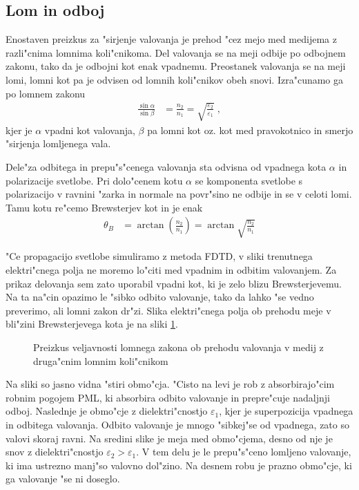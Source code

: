 \documentclass[a4paper,10pt]{article}
\begin{document}
\subsection{Lom in odboj}
Enostaven preizkus za "sirjenje valovanja je prehod "cez mejo med medijema z razli"cnima lomnima koli"cnikoma. 
Del valovanja se na meji odbije po odbojnem zakonu, tako da je odbojni kot enak vpadnemu. 
Preostanek valovanja se na meji lomi, lomni kot pa je odvisen od lomnih koli"cnikov obeh snovi. 
Izra"cunamo ga po lomnem zakonu
\begin{align}
 \frac{\sin\alpha}{\sin\beta} &= \frac{n_2}{n_1} = \sqrt{\frac{\varepsilon_2}{\varepsilon_1}}\;, 
\end{align}
kjer je $\alpha$ vpadni kot valovanja, $\beta$ pa lomni kot oz. kot med pravokotnico in smerjo "sirjenja lomljenega vala. 

Dele"za odbitega in prepu"s"cenega valovanja sta odvisna od vpadnega kota $\alpha$ in polarizacije svetlobe\cite{wiki:brewster}. 
Pri dolo"cenem kotu $\alpha$ se komponenta svetlobe s polarizacijo v ravnini "zarka in normale na povr"sino ne odbije in se v celoti lomi. 
Tamu kotu re"cemo Brewsterjev kot in je enak
\begin{align}
 \theta_B &= \arctan\left(\frac{n_2}{n_1}\right) = \arctan\sqrt{\frac{n_2}{n_1}}
\end{align}

"Ce propagacijo svetlobe simuliramo z metoda \ac{FDTD}, v sliki trenutnega elektri"cnega polja ne moremo lo"citi med vpadnim in odbitim valovanjem. 
Za prikaz delovanja sem zato uporabil vpadni kot, ki je zelo blizu Brewsterjevemu. 
Na ta na"cin opazimo le "sibko odbito valovanje, tako da lahko "se vedno preverimo, ali lomni zakon dr"zi. 
Slika elektri"cnega polja ob prehodu meje v bli"zini Brewsterjevega kota je na sliki \ref{fig:refraction-test}. 

\begin{figure}[h]
 \centering
 
 \vspace{-1.7cm}
 \caption{Preizkus veljavnosti lomnega zakona ob prehodu valovanja v medij z druga"cnim lomnim koli"cnikom}
 \label{fig:refraction-test}
\end{figure}

Na sliki so jasno vidna "stiri obmo"cja. "Cisto na levi je rob z absorbirajo"cim robnim pogojem \ac{PML}, ki absorbira odbito valovanje in prepre"cuje nadaljnji odboj. 
Naslednje je obmo"cje z dielektri"cnostjo $\varepsilon_1$, kjer je superpozicija vpadnega in odbitega valovanja. 
Odbito valovanje je mnogo "sibkej"se od vpadnega, zato so valovi skoraj ravni. 
Na sredini slike je meja med obmo"cjema, desno od nje je snov z dielektri"cnostjo $\varepsilon_2 > \varepsilon_1$.
V tem delu je le prepu"s"ceno lomljeno valovanje, ki ima ustrezno manj"so valovno dol"zino. 
Na desnem robu je prazno obmo"cje, ki ga valovanje "se ni doseglo. 
\end{document}
